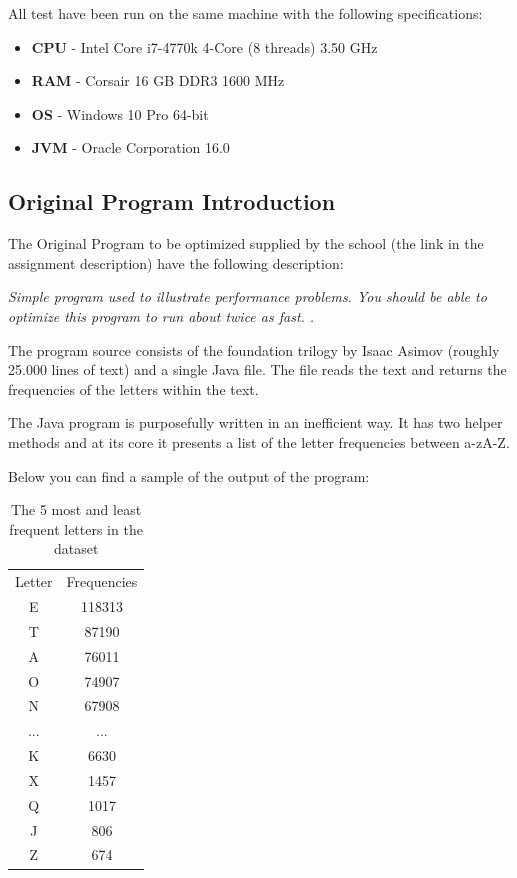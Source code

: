 
All test have been run on the same machine with the following specifications: 


\begin{itemize}
    \item \textbf{CPU} - Intel Core i7-4770k 4-Core (8 threads) 3.50 GHz
    \item \textbf{RAM} - Corsair 16 GB DDR3 1600 MHz 
    \item \textbf{OS} - Windows 10 Pro 64-bit
    \item \textbf{JVM} - Oracle Corporation 16.0
\end{itemize}
\vspace{0.5cm}
\subsection{Original Program Introduction}



\label{sec:2.1}
The Original Program to be optimized supplied by the school (the link in the assignment description) have the following description:
\begin{displayquote}
\emph{Simple program used to illustrate performance problems. You should be able to optimize this program to run about twice as fast. \cite{cph}.} 
\end{displayquote}

The program source consists of the foundation trilogy by Isaac Asimov (roughly 25.000 lines of text) and a single Java file.
The file reads the text and returns the frequencies of the letters within the text.

The Java program is purposefully written in an inefficient way. It has two helper methods and at its core it presents a list of the letter frequencies between a-zA-Z. 

Below you can find a sample of the output of the program:

\begin{table}[h]
    \centering
    \begin{tabular}{cc}
    Letter & Frequencies \\
    E      & 118313      \\
    T      & 87190       \\
    A      & 76011       \\
    O      & 74907       \\
    N      & 67908       \\
    ...    & ...         \\
    K      & 6630        \\
    X      & 1457        \\
    Q      & 1017        \\
    J      & 806         \\
    Z      & 674        
    \end{tabular}
    \caption{The 5 most and least frequent letters in the dataset}
\end{table}

